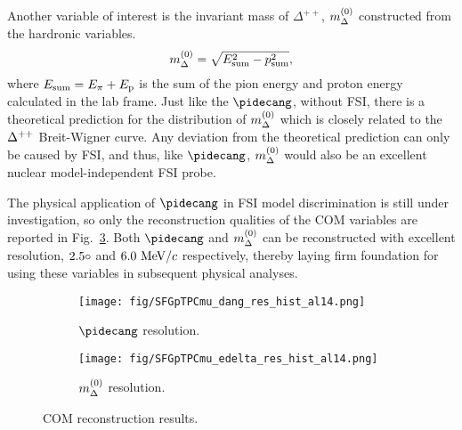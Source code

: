     Another variable of interest is the invariant mass of $\Delta^{++}$, $m_{\Delta}^{(0)}$ constructed from the hardronic variables.
    \begin{equation}
        m_{\Delta}^{(0)}=\sqrt{E_{\textrm{sum}}^2-p_{\textrm{sum}}^2},
    \end{equation}
    where $E_{\textrm{sum}}=E_{\pi}+E_\textrm{p}$ is the sum of the pion energy and proton energy calculated in the lab frame. 
    Just like the $\pidecang$, without FSI, there is a theoretical prediction for the distribution of $m_{\Delta}^{(0)}$ which is closely related to the $\Delta^{++}$  Breit-Wigner curve. 
    Any deviation from the theoretical prediction can only be caused by FSI, and thus, like $\pidecang$, $m_{\Delta}^{(0)}$ would also be an excellent nuclear model-independent FSI probe.

    The physical application of $\pidecang$ in FSI model discrimination is still under investigation, so only the reconstruction qualities of the COM variables are reported in Fig.~\ref{fig:1pi-com-res}. 
    Both $\pidecang$ and $m_{\Delta}^{(0)}$ can be reconstructed with excellent resolution, $2.5\circ$ and $6.0~\textrm{MeV}/c$ respectively, thereby laying firm foundation for using these variables in subsequent physical analyses.

   \begin{figure}[!htb] 
       \centering
       \begin{subfigure}{0.45\textwidth}
            \texttt{[image: fig/SFGpTPCmu\_dang\_res\_hist\_al14.png]}
            \caption{$\pidecang$ resolution.}
            \label{fig:1pi-decang-res}
       \end{subfigure}
       \begin{subfigure}{0.45\textwidth}
            \texttt{[image: fig/SFGpTPCmu\_edelta\_res\_hist\_al14.png]}
            \caption{$m_{\Delta}^{(0)}$ resolution.}
            \label{fig:1pi-mdel-res}
       \end{subfigure}
       \caption{COM reconstruction results.}
       \label{fig:1pi-com-res}
    \end{figure}
 

\minitoc
